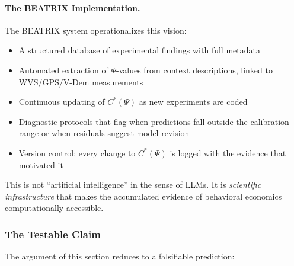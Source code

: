 \paragraph{The BEATRIX Implementation.}
The BEATRIX system operationalizes this vision:
\begin{itemize}
    \item A structured database of experimental findings with full metadata
    \item Automated extraction of $\Psi$-values from context descriptions,
          linked to WVS/GPS/V-Dem measurements
    \item Continuous updating of $C^*(\Psi)$ as new experiments are coded
    \item Diagnostic protocols that flag when predictions fall outside
          the calibration range or when residuals suggest model revision
    \item Version control: every change to $C^*(\Psi)$ is logged with the
          evidence that motivated it
\end{itemize}

This is not ``artificial intelligence'' in the sense of LLMs. It is
\emph{scientific infrastructure} that makes the accumulated evidence of
behavioral economics computationally accessible.


\subsubsection{The Testable Claim}

The argument of this section reduces to a falsifiable prediction:

\begin{center}
\end{center}

